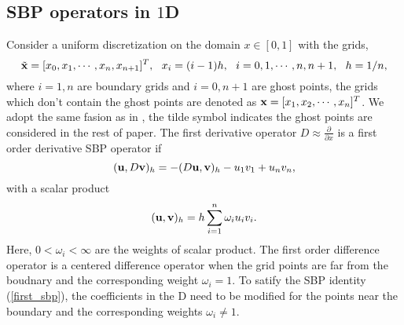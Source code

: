 \documentclass[a4paper]{article}
\begin{document}
\subsection{SBP operators in $1$D}
Consider a uniform discretization on the domain $x\in[0,1]$ with the grids,
\[\tilde{{\bf x}} = [x_0,x_1,\cdots,x_n,x_{n+1}]^T,\ \  x_i = (i-1)h,\ \ i = 0,1,\cdots,n,n+1,\ \ h = 1/n,\]
where $i = 1,n$ are boundary grids and $i = 0,n+1$ are ghost points, the grids which don't contain the ghost points are denoted as ${\bf x} = [x_1,x_2,\cdots,x_n]^T$. We adopt the same fasion as in \cite{?}, the tilde symbol indicates the ghost points are considered in the rest of paper. The first derivative operator $D \approx \frac{\partial }{\partial x}$ is a first order derivative SBP operator if 
\begin{equation}\label{first_sbp}
({\bf u}, D{\bf v})_h = -(D{\bf u},{\bf v})_h - u_1v_1 + u_nv_n,
\end{equation}
with a scalar product
\begin{equation}\label{inner_product}
({\bf u},{\bf v})_h = h\sum_{i = 1}^{n}\omega_iu_iv_i.
\end{equation}
Here, $0<\omega_i < \infty $ are the weights of scalar product. The first order difference operator is a centered difference  operator when the grid points are far from the boudnary and the corresponding weight $\omega_i = 1$. To satify the SBP identity (\ref{first_sbp}), the coefficients in the D need to be modified for the points near the boundary and the corresponding weights $\omega_i \neq 1$.
\end{document}
